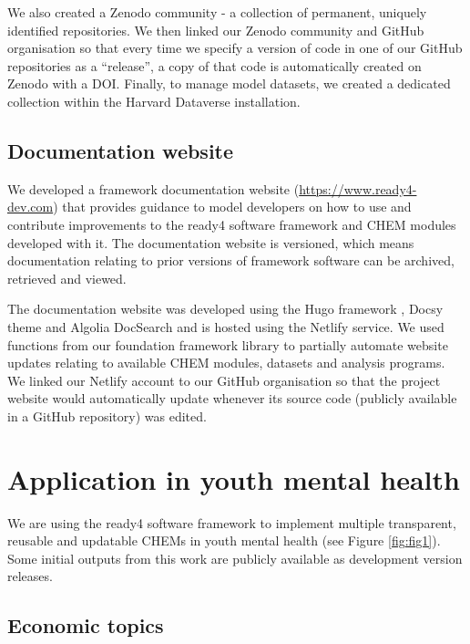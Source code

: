 \documentclass[sn-vancouver,Numbered,pdflatex]{sn-jnl}
\theoremstyle{remark}
\theoremstyle{definition}
\begin{document}
We also created a Zenodo community - a collection of permanent, uniquely identified repositories. We then linked our Zenodo community and GitHub organisation so that every time we specify a version of code in one of our GitHub repositories as a ``release'', a copy of that code is automatically created on Zenodo with a DOI. Finally, to manage model datasets, we created a dedicated collection within the Harvard Dataverse installation.

\hypertarget{documentation-website}{%
\subsection{Documentation website}\label{documentation-website}}

We developed a framework documentation website (\url{https://www.ready4-dev.com}) that provides guidance to model developers on how to use and contribute improvements to the ready4 software framework and CHEM modules developed with it. The documentation website is versioned, which means documentation relating to prior versions of framework software can be archived, retrieved and viewed.

The documentation website was developed using the Hugo framework \citep{hugo_2023}, Docsy theme \citep{docsy_2023} and Algolia DocSearch \citep{algoliadocsearch_2023} and is hosted using the Netlify \citep{netlify_2023} service. We used functions from our foundation framework library to partially automate website updates relating to available CHEM modules, datasets and analysis programs. We linked our Netlify account to our GitHub organisation so that the project website would automatically update whenever its source code (publicly available in a GitHub repository) was edited.

\hypertarget{application-in-youth-mental-health}{%
\section{Application in youth mental health}\label{application-in-youth-mental-health}}

We are using the ready4 software framework to implement multiple transparent, reusable and updatable CHEMs in youth mental health (see Figure \ref{fig:fig1}). Some initial outputs from this work are publicly available as development version releases.

\hypertarget{economic-topics}{%
\subsection{Economic topics}\label{economic-topics}}
\end{document}
